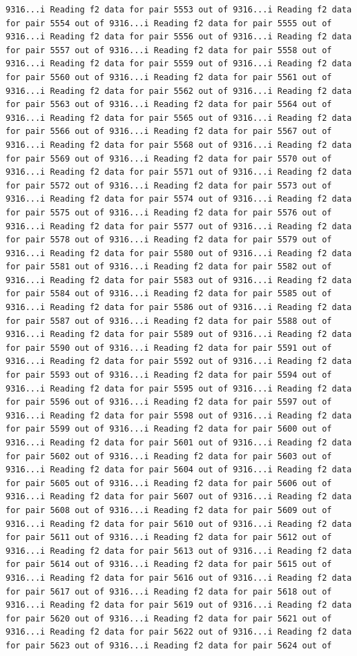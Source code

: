 \documentclass[
]{article}
\begin{document}
\begin{verbatim}
9316...i Reading f2 data for pair 5553 out of 9316...i Reading f2 data for pair 5554 out of 9316...i Reading f2 data for pair 5555 out of 9316...i Reading f2 data for pair 5556 out of 9316...i Reading f2 data for pair 5557 out of 9316...i Reading f2 data for pair 5558 out of 9316...i Reading f2 data for pair 5559 out of 9316...i Reading f2 data for pair 5560 out of 9316...i Reading f2 data for pair 5561 out of 9316...i Reading f2 data for pair 5562 out of 9316...i Reading f2 data for pair 5563 out of 9316...i Reading f2 data for pair 5564 out of 9316...i Reading f2 data for pair 5565 out of 9316...i Reading f2 data for pair 5566 out of 9316...i Reading f2 data for pair 5567 out of 9316...i Reading f2 data for pair 5568 out of 9316...i Reading f2 data for pair 5569 out of 9316...i Reading f2 data for pair 5570 out of 9316...i Reading f2 data for pair 5571 out of 9316...i Reading f2 data for pair 5572 out of 9316...i Reading f2 data for pair 5573 out of 9316...i Reading f2 data for pair 5574 out of 9316...i Reading f2 data for pair 5575 out of 9316...i Reading f2 data for pair 5576 out of 9316...i Reading f2 data for pair 5577 out of 9316...i Reading f2 data for pair 5578 out of 9316...i Reading f2 data for pair 5579 out of 9316...i Reading f2 data for pair 5580 out of 9316...i Reading f2 data for pair 5581 out of 9316...i Reading f2 data for pair 5582 out of 9316...i Reading f2 data for pair 5583 out of 9316...i Reading f2 data for pair 5584 out of 9316...i Reading f2 data for pair 5585 out of 9316...i Reading f2 data for pair 5586 out of 9316...i Reading f2 data for pair 5587 out of 9316...i Reading f2 data for pair 5588 out of 9316...i Reading f2 data for pair 5589 out of 9316...i Reading f2 data for pair 5590 out of 9316...i Reading f2 data for pair 5591 out of 9316...i Reading f2 data for pair 5592 out of 9316...i Reading f2 data for pair 5593 out of 9316...i Reading f2 data for pair 5594 out of 9316...i Reading f2 data for pair 5595 out of 9316...i Reading f2 data for pair 5596 out of 9316...i Reading f2 data for pair 5597 out of 9316...i Reading f2 data for pair 5598 out of 9316...i Reading f2 data for pair 5599 out of 9316...i Reading f2 data for pair 5600 out of 9316...i Reading f2 data for pair 5601 out of 9316...i Reading f2 data for pair 5602 out of 9316...i Reading f2 data for pair 5603 out of 9316...i Reading f2 data for pair 5604 out of 9316...i Reading f2 data for pair 5605 out of 9316...i Reading f2 data for pair 5606 out of 9316...i Reading f2 data for pair 5607 out of 9316...i Reading f2 data for pair 5608 out of 9316...i Reading f2 data for pair 5609 out of 9316...i Reading f2 data for pair 5610 out of 9316...i Reading f2 data for pair 5611 out of 9316...i Reading f2 data for pair 5612 out of 9316...i Reading f2 data for pair 5613 out of 9316...i Reading f2 data for pair 5614 out of 9316...i Reading f2 data for pair 5615 out of 9316...i Reading f2 data for pair 5616 out of 9316...i Reading f2 data for pair 5617 out of 9316...i Reading f2 data for pair 5618 out of 9316...i Reading f2 data for pair 5619 out of 9316...i Reading f2 data for pair 5620 out of 9316...i Reading f2 data for pair 5621 out of 9316...i Reading f2 data for pair 5622 out of 9316...i Reading f2 data for pair 5623 out of 9316...i Reading f2 data for pair 5624 out of 
\end{verbatim}
\end{document}
